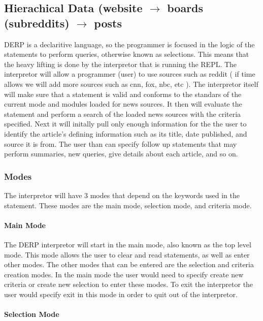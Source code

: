 \subsection{Hierachical Data (website $\rightarrow$ boards (subreddits) $\rightarrow$ posts}
DERP is a declaritive language, so the programmer is focused in the logic of the statements to perform queries, otherwise known as selections. This means that the heavy lifting is done by the interpretor that is running the REPL. The interpretor will allow a programmer (user) to use sources such as reddit ( if time allows we will add more sources such as cnn, fox, nbc, etc ). The interpretor itself will make sure that a statement is valid and conforms to the standars of the current mode and modules loaded for news sources. It then will evaluate the statement and perform a search of the loaded news sources with the criteria specified. Next it will initally pull only enough information for the the user to identify the article's defining information such as its title, date published, and source it is from. The user than can specify follow up statements that may perform summaries, new queries, give details about each article, and so on. \\


\subsubsection{Modes}
The interpretor will have 3 modes that depend on the keywords used in the statement. These modes are the main mode, selection mode, and criteria mode.

\paragraph{Main Mode}

The DERP interpretor will start in the main mode, also known as the top level mode. This mode allows the user to clear and read statements, as well as enter other modes. The other modes that can be entered are the selection and criteria creation modes. In the main mode the user would need to specify create new criteria or create new selection to enter these modes. To exit the interpretor the user would specify exit in this mode in order to quit out of the interpretor. \\

\paragraph{Selection Mode}

